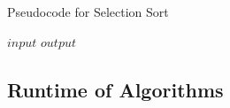 \begin{algorithm}
	\algrenewcommand{}
	\algrenewcommand{}
	\caption{Pseudocode for Selection Sort}\label{alg:selection-sort}
	\begin{algorithmic}[1]
		\Require $input$
		\Ensure $output$
		\EndFor
	\end{algorithmic}
\end{algorithm}

\subsection{Runtime of Algorithms}
